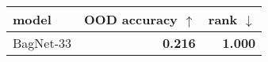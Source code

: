 \begin{tabular}{lrr}
\toprule
    model & OOD accuracy $\uparrow$ & rank $\downarrow$ \\
\midrule
BagNet-33 &          \textbf{0.216} &    \textbf{1.000} \\
\bottomrule
\end{tabular}


